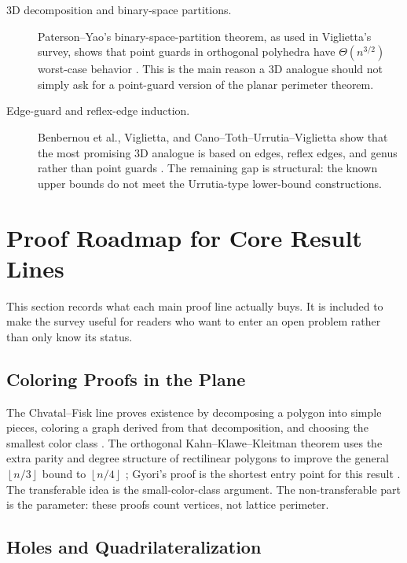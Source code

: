 \documentclass[11pt]{article}
\newcommand{\floor}[1]{\left\lfloor #1 \right\rfloor}
\begin{document}
\begin{description}
  \item[3D decomposition and binary-space partitions.]
  Paterson--Yao's binary-space-partition theorem, as used in Viglietta's
  survey, shows that point guards in orthogonal polyhedra have
  $\Theta(n^{3/2})$ worst-case behavior
  \cite{PatersonYao1992,VigliettaThesis}.  This is the main reason a 3D
  analogue should not simply ask for a point-guard version of the planar
  perimeter theorem.

  \item[Edge-guard and reflex-edge induction.]
  Benbernou et al., Viglietta, and Cano--Toth--Urrutia--Viglietta show that
  the most promising 3D analogue is based on edges, reflex edges, and genus
  rather than point guards
  \cite{BenbernouEtAl2011,Viglietta2020,CanoTothUrrutiaViglietta2022}.  The
  remaining gap is structural: the known upper bounds do not meet the
  Urrutia-type lower-bound constructions.
\end{description}

\section{Proof Roadmap for Core Result Lines}

This section records what each main proof line actually buys.  It is included
to make the survey useful for readers who want to enter an open problem rather
than only know its status.

\subsection{Coloring Proofs in the Plane}

The Chvatal--Fisk line proves existence by decomposing a polygon into simple
pieces, coloring a graph derived from that decomposition, and choosing the
smallest color class \cite{Chvatal1975,Fisk1978}.  The orthogonal
Kahn--Klawe--Kleitman theorem uses the extra parity and degree structure of
rectilinear polygons to improve the general $\floor{n/3}$ bound to
$\floor{n/4}$ \cite{KahnKlaweKleitman1983}; Gyori's proof is the shortest
entry point for this result \cite{Gyori1986}.  The transferable idea is the
small-color-class argument.  The non-transferable part is the parameter: these
proofs count vertices, not lattice perimeter.

\subsection{Holes and Quadrilateralization}
\end{document}
